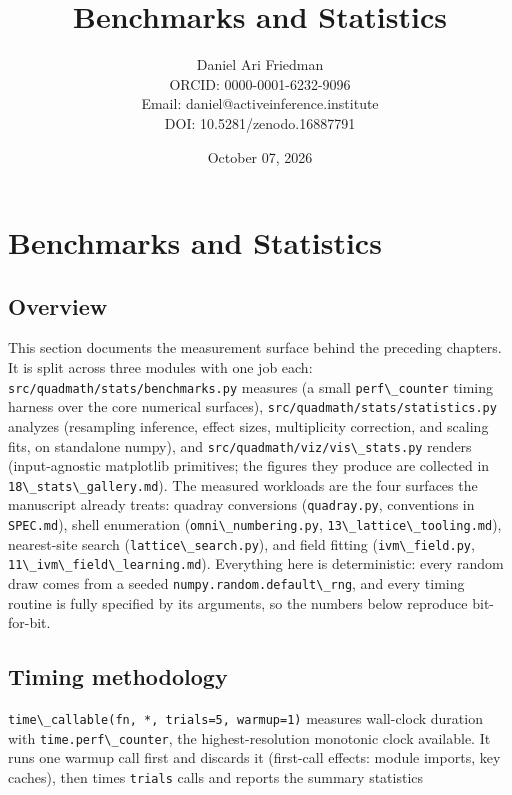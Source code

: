 \documentclass[
  10pt,
]{article}
\title{Benchmarks and Statistics}
\author{Daniel Ari Friedman\\ ORCID: 0000-0001-6232-9096\\ Email: daniel@activeinference.institute\\ DOI: 10.5281/zenodo.16887791}
\date{October 07, 2026}
\newcommand{\passthrough}[1]{#1}
\begin{document}
\maketitle

{
\hypersetup{linkcolor=black}
\setcounter{tocdepth}{3}
\tableofcontents
}
\section{Benchmarks and Statistics}\label{benchmarks-and-statistics}

\subsection{Overview}\label{overview}

This section documents the measurement surface behind the preceding
chapters. It is split across three modules with one job each:
\passthrough{\lstinline!src/quadmath/stats/benchmarks.py!} measures (a
small \passthrough{\lstinline!perf\_counter!} timing harness over the
core numerical surfaces),
\passthrough{\lstinline!src/quadmath/stats/statistics.py!} analyzes
(resampling inference, effect sizes, multiplicity correction, and
scaling fits, on standalone numpy), and
\passthrough{\lstinline!src/quadmath/viz/vis\_stats.py!} renders
(input-agnostic matplotlib primitives; the figures they produce are
collected in \passthrough{\lstinline!18\_stats\_gallery.md!}). The
measured workloads are the four surfaces the manuscript already treats:
quadray conversions (\passthrough{\lstinline!quadray.py!}, conventions
in \passthrough{\lstinline!SPEC.md!}), shell enumeration
(\passthrough{\lstinline!omni\_numbering.py!},
\passthrough{\lstinline!13\_lattice\_tooling.md!}), nearest-site search
(\passthrough{\lstinline!lattice\_search.py!}), and field fitting
(\passthrough{\lstinline!ivm\_field.py!},
\passthrough{\lstinline!11\_ivm\_field\_learning.md!}). Everything here
is deterministic: every random draw comes from a seeded
\passthrough{\lstinline!numpy.random.default\_rng!}, and every timing
routine is fully specified by its arguments, so the numbers below
reproduce bit-for-bit.

\subsection{Timing methodology}\label{timing-methodology}

\passthrough{\lstinline!time\_callable(fn, *, trials=5, warmup=1)!}
measures wall-clock duration with
\passthrough{\lstinline!time.perf\_counter!}, the highest-resolution
monotonic clock available. It runs one warmup call first and discards it
(first-call effects: module imports, key caches), then times
\passthrough{\lstinline!trials!} calls and reports the summary
statistics
\end{document}
